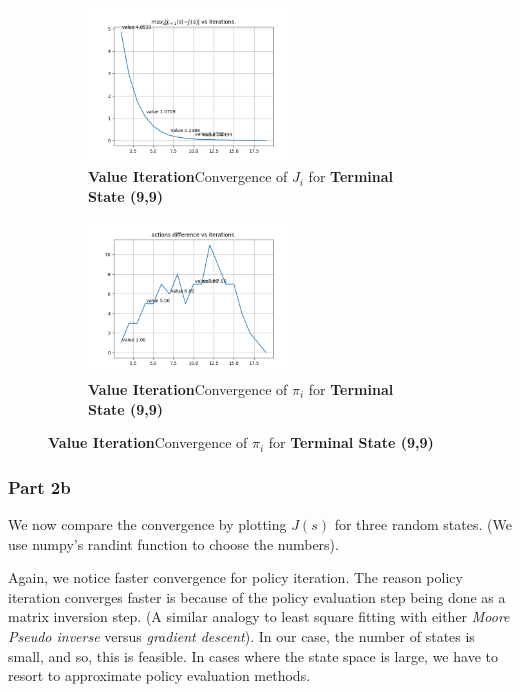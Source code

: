 \begin{figure}[h]
\begin{subfigure}
\centering
\includegraphics[angle=0,width=0.6\textwidth]{hw4/logs/value_iter_t=99_N=20/convergence-difference-till-20.png}
\caption{ \textbf{Value Iteration}Convergence of $J_i$ for \textbf{Terminal State (9,9)}}
\end{subfigure}

\begin{subfigure}
\centering
\includegraphics[angle=0,width=0.6\textwidth]{hw4/logs/value_iter_t=99_N=20/actions-difference-till-20.png}
\caption{ \textbf{Value Iteration}Convergence of $\pi_i$ for \textbf{Terminal State (9,9)}}
\end{subfigure}
\end{figure}

\subsubsection{Part 2b}

We now compare the convergence by plotting $J(s)$ for three random states. (We use numpy's randint function to choose the numbers).

Again, we notice faster convergence for policy iteration. The reason policy iteration converges faster is because of the policy evaluation step being done as a matrix inversion step. (A similar analogy to least square fitting with either \textit{Moore Pseudo inverse} versus \textit{gradient descent}). In our case, the number of states is small, and so, this is feasible. In cases where the state space is large, we have to resort to approximate policy evaluation methods.

